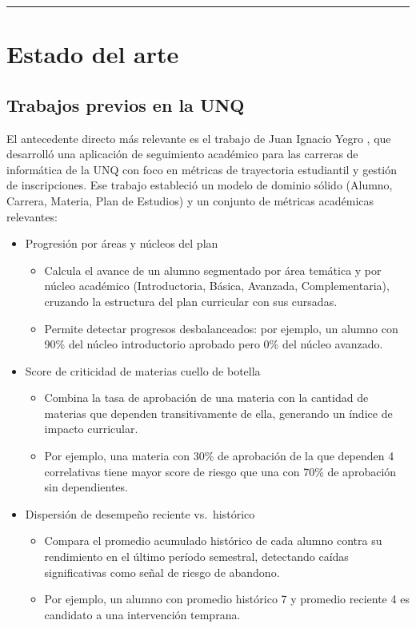\documentclass[
  spanish,
]{article}
\begin{document}
\begin{center}\rule{0.5\linewidth}{0.5pt}\end{center}

\section{Estado del arte}\label{estado-del-arte}

\subsection{Trabajos previos en la UNQ}\label{trabajos-previos-en-la-unq}

El antecedente directo más relevante es el trabajo de Juan Ignacio Yegro \citet{yegro2021},
que desarrolló una aplicación de seguimiento académico para las carreras de
informática de la UNQ con foco en métricas de trayectoria estudiantil y
gestión de inscripciones. Ese trabajo estableció un modelo de dominio sólido
(Alumno, Carrera, Materia, Plan de Estudios) y un conjunto de métricas académicas relevantes:

\begin{itemize}
\item Progresión por áreas y núcleos del plan
  \begin{itemize}
  \item Calcula el avance de un alumno segmentado por área temática y por núcleo académico (Introductoria, Básica, Avanzada, Complementaria), cruzando la estructura del plan curricular con sus cursadas.
  \item Permite detectar progresos desbalanceados: por ejemplo, un alumno con 90\% del núcleo introductorio aprobado pero 0\% del núcleo avanzado.
  \end{itemize}
\item Score de criticidad de materias cuello de botella
  \begin{itemize}
  \item Combina la tasa de aprobación de una materia con la cantidad de materias que dependen transitivamente de ella, generando un índice de impacto curricular.
  \item Por ejemplo, una materia con 30\% de aprobación de la que dependen 4 correlativas tiene mayor score de riesgo que una con 70\% de aprobación sin dependientes.
  \end{itemize}
\item Dispersión de desempeño reciente vs.\ histórico
  \begin{itemize}
  \item Compara el promedio acumulado histórico de cada alumno contra su rendimiento en el último período semestral, detectando caídas significativas como señal de riesgo de abandono.
  \item Por ejemplo, un alumno con promedio histórico 7 y promedio reciente 4 es candidato a una intervención temprana.
  \end{itemize}
\end{itemize}
\end{document}
